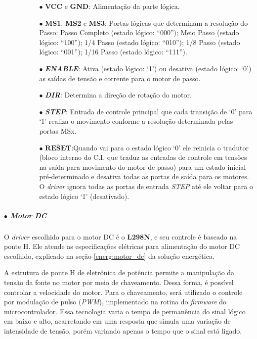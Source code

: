     \begin{itemize}
        \item[ ]
        \begin{itemize}
            \item[ ]
            \begin{itemize}
                \item[$\bullet$] \textbf{VCC} e \textbf{GND}: Alimentação da parte lógica.
                \item[$\bullet$] \textbf{MS1}, \textbf{MS2} e \textbf{MS3}: Portas lógicas que determinam a resolução do Passo: Passo Completo (estado lógico: ``000''); Meio Passo (estado lógico: ``100''); 1/4 Passo (estado lógico: ``010''); 1/8 Passo (estado lógico: ``001'');  1/16 Passo (estado lógico: ``111'').
                \item[$\bullet$] \textbf{\textit{ENABLE}}: Ativa (estado lógico: `1') ou desativa (estado lógico: `0') as saídas de tensão  e corrente para o motor de passo.
                \item[$\bullet$] \textbf{\textit{DIR}}: Determina a direção de rotação do motor.
                \item[$\bullet$] \textbf{\textit{STEP}}: Entrada de controle principal que cada transição de `0' para `1' realiza o movimento conforme a resolução determinada pelas portas MSx.
                \item[$\bullet$] \textbf{$\overline{\textbf{RESET}}$}:Quando vai para o estado lógico `0' ele reinicia o tradutor (bloco interno do C.I. que traduz as entradas de controle em tensões na saída para movimento do motor de passo) para um estado inicial pré-determinado e desativa todas as portas de saída para os motores. O \textit{driver} ignora todas as portas de entrada \textit{STEP} até ele voltar para o estado lógico `1' (desativado).
            \end{itemize}
        \end{itemize}
    \end{itemize}
    
    \subparagraph*{$\bullet$ \textbf{Motor DC}}
    
    O \textit{driver} escolhido para o motor DC é o \textbf{L298N}, e seu controle é baseado na ponte H. Ele atende as especificações elétricas para alimentação do motor DC escolhido, explicado na seção \ref{energ:motor_dc} da solução energética. 
    
    A estrutura de ponte H de eletrônica de potência permite a manipulação da tensão da fonte no motor por meio de chaveamento. Dessa forma, é possível controlar a velocidade do motor. Para o chaveamento, será utilizado o controle por modulação de pulso (\textit{PWM}), implementado na rotina do \textit{firmware} do microcontrolador. Essa tecnologia varia o tempo de permanência do sinal lógico em baixo e alto, acarretando em uma resposta que simula uma variação de intensidade de tensão, porém variando apenas o tempo que o sinal está ligado.  
    
